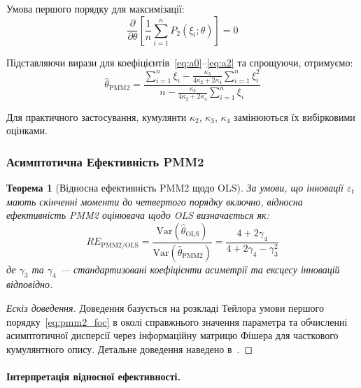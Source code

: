 \documentclass[12pt,a4paper]{article}
\newtheorem{theorem}{Теорема}[section]
\begin{document}
	Умова першого порядку для максимізації:
	\begin{equation}
		\label{eq:pmm2_foc}
		\frac{\partial}{\partial \theta} \left[ \frac{1}{n} \sum_{i=1}^{n} P_2(\xi_i; \theta) \right] = 0
	\end{equation}
	
	Підставляючи вирази для коефіцієнтів~\eqref{eq:a0}--\eqref{eq:a2} та спрощуючи, отримуємо:
	\begin{equation}
		\label{eq:pmm2_solution}
		\hat{\theta}_{\text{PMM2}} = \frac{\sum_{i=1}^{n} \xi_i - \frac{\kappa_3}{4\kappa_2 + 2\kappa_4} \sum_{i=1}^{n} \xi_i^2}{n - \frac{\kappa_3}{4\kappa_2 + 2\kappa_4} \sum_{i=1}^{n} \xi_i}
	\end{equation}
	
	Для практичного застосування, кумулянти $\kappa_2$, $\kappa_3$, $\kappa_4$ замінюються їх вибірковими оцінками.
	
	\subsubsection{Асимптотична Ефективність PMM2}
	
	\begin{theorem}[Відносна ефективність PMM2 щодо OLS]
		\label{thm:relative_efficiency}
		За умови, що інновації $\varepsilon_t$ мають скінченні моменти до четвертого порядку включно, відносна ефективність PMM2 оцінювача щодо OLS визначається як:
		\begin{equation}
			\label{eq:re_pmm2_ols}
			RE_{\text{PMM2/OLS}} = \frac{\text{Var}(\hat{\theta}_{\text{OLS}})}{\text{Var}(\hat{\theta}_{\text{PMM2}})} = \frac{4 + 2\gamma_4}{4 + 2\gamma_4 - \gamma_3^2}
		\end{equation}
		де $\gamma_3$ та $\gamma_4$ --- стандартизовані коефіцієнти асиметрії та ексцесу інновацій відповідно.
	\end{theorem}
	
	\begin{proof}[Ескіз доведення]
		Доведення базується на розкладі Тейлора умови першого порядку~\eqref{eq:pmm2_foc} в околі справжнього значення параметра та обчисленні асимптотичної дисперсії через інформаційну матрицю Фішера для часткового кумулянтного опису. Детальне доведення наведено в~\cite{kunchenko2002polynomial,zabolotnii2018polynomial}.
	\end{proof}
	
	\paragraph{Інтерпретація відносної ефективності.}
	
\end{document}
